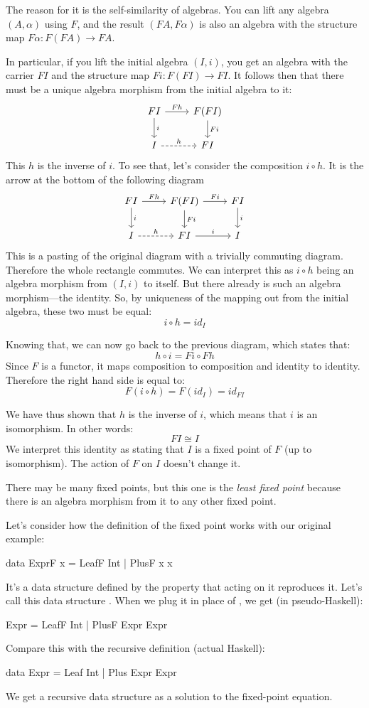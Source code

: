 \documentclass[DaoFP]{subfiles}
\begin{document}
The reason for it is the self-similarity of algebras. You can lift any algebra $(A, \alpha)$ using $F$, and the result $(F A, F \alpha)$ is also an algebra with the structure map $F \alpha \colon F (F A) \to F A$. 

In particular, if you lift the initial algebra $(I, i)$, you get an algebra with the carrier $F I$ and the structure map $F i \colon F (F I) \to F I$. It follows then that there must be a unique algebra morphism from the initial algebra to it:
\[
 \begin{tikzcd}
 F I 
 \arrow[r, "F h"]
 \arrow[d, "i"]
 & F (F I)
\arrow[d, "F i"]
 \\
 I
 \arrow[r, dashed, "h"]
 & F I
  \end{tikzcd}
\]
This $h$ is the inverse of $i$. To see that, let's consider the composition $i \circ h$. It is the arrow at the bottom of the following diagram
\[
 \begin{tikzcd}
 F I 
 \arrow[r, "F h"]
 \arrow[d, "i"]
 & F (F I)
\arrow[d, "F i"]
\arrow[r, "F i"]
& F I
\arrow[d, "i"]
 \\
 I
 \arrow[r, dashed, "h"]
 & F I
 \arrow[r, "i"]
 & I
  \end{tikzcd}
\]
This is a pasting of the original diagram with a trivially commuting diagram. Therefore the whole rectangle commutes. We can interpret this as $i \circ h$ being an algebra morphism from $(I, i)$ to itself. But there already is such an algebra morphism---the identity. So, by uniqueness of the mapping out from the initial algebra, these two must be equal:
\[ i \circ h = id_I \] 

Knowing that, we can now go back to the previous diagram, which states that:
\[ h \circ i = F i \circ F h \]
Since $F$ is a functor, it maps composition to composition and identity to identity. Therefore the right hand side is equal to:
\[ F (i \circ h) = F (id_I) = id_{F I} \]

We have thus shown that $h$ is the inverse of $i$, which means that $i$ is an isomorphism. In other words:
\[ F I \cong I \]
We interpret this identity as stating that $I$ is a fixed point of $F$ (up to isomorphism). The action of $F$ on $I$ doesn't change it. 

There may be many fixed points, but this one is the \emph{least fixed point} because there is an algebra morphism from it to any other fixed point. 

Let's consider how the definition of the fixed point works with our original example:
\begin{haskell}
data ExprF x = LeafF Int | PlusF x x
\end{haskell}
It's a data structure defined by the property that  acting on it reproduces it. Let's call this data structure . When we plug it in place of , we get (in pseudo-Haskell):
\begin{haskell}
Expr = LeafF Int | PlusF Expr Expr
\end{haskell}
Compare this with the recursive definition (actual Haskell):
\begin{haskell}
data Expr = Leaf Int | Plus Expr Expr
\end{haskell}
We get a recursive data structure as a solution to the fixed-point equation.
\end{document}
